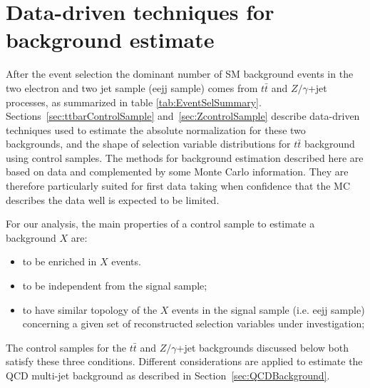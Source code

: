 % 

\section{Data-driven techniques for background estimate} \label{sec:bkgStudy}
After the event selection the dominant number of SM background events in the two electron 
and two jet sample (eejj sample) comes from $t\bar{t}$ and $Z/\gamma$+jet processes, 
as summarized in table \ref{tab:EventSelSummary}. 
Sections~\ref{sec:ttbarControlSample} and~\ref{sec:ZcontrolSample} 
describe data-driven techniques used to estimate the absolute 
normalization for these two backgrounds, and the shape of selection variable 
distributions for $t\bar{t}$ background using control samples. 
The methods for background estimation described here are based on data and complemented by some Monte Carlo information. 
They are therefore particularly suited for first data taking when confidence that the MC describes
the data well is expected to be limited.

For our analysis, the main properties of a control sample to estimate a background $X$ are:
\begin{itemize}
%
\item to be enriched in $X$ events.
%
\item to be independent from the signal sample;
%
\item to have similar topology of the $X$ events in the signal sample (i.e. eejj sample) 
concerning a given set of reconstructed selection variables under investigation;  
%
\end{itemize}
%
The control samples for the $t\bar{t}$ and $Z/\gamma$+jet backgrounds discussed below both satisfy 
these three conditions.
Different considerations are applied to estimate the QCD multi-jet background as described in 
Section~\ref{sec:QCDBackground}.



